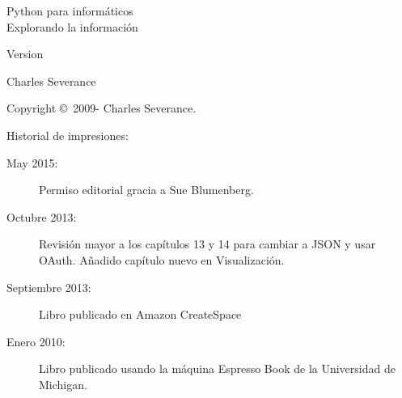 



\newtheorem{ex}{Exercise}[chapter]

\begin{latexonly}

\renewcommand{\blankpage}{\thispagestyle{empty} \quad \newpage}

\thispagestyle{empty}

\begin{flushright}
\vspace*{2.0in}

\begin{spacing}{3}
{\huge Python para informáticos}\\
{\Large Explorando la información}
\end{spacing}

\vspace{0.25in}

Version \theversion

\vspace{0.5in}


{\Large
Charles Severance\\
}

\vfill

\end{flushright}

\pagebreak
\thispagestyle{empty}

{\small
Copyright \copyright ~2009- Charles Severance.


Historial de impresiones:

\begin{description}

\item[May 2015:] Permiso editorial gracia a Sue Blumenberg.

\item[Octubre 2013:] Revisión mayor a los capítulos 13 y 14
para cambiar a JSON y usar OAuth.
Añadido capítulo nuevo en Visualización.

\item[Septiembre 2013:] Libro publicado en Amazon CreateSpace

\item[Enero 2010:] Libro publicado usando la máquina
Espresso Book de la Universidad de Michigan.


\end{description}}
\end{latexonly}
